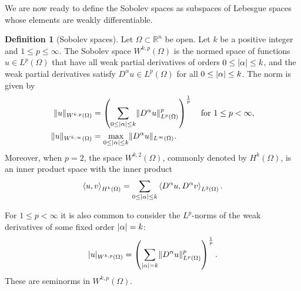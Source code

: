 \documentclass[english, 12pt, a4paper, sci, utf8, a-2b, online]{aaltothesis}
\theoremstyle{definition}
\newtheorem{definition}{Definition}[section]
\theoremstyle{plain}
\DeclarePairedDelimiter\abs{\lvert}{\rvert}
\DeclarePairedDelimiter\norm{\lVert}{\rVert}
\newcommand*{\innerprod}[2]{\left\langle #1, #2 \right\rangle}
\numberwithin{equation}{section}
\begin{document}
We are now ready to define the Sobolev spaces as subspaces of Lebesgue
spaces whose elements are weakly differentiable.
\begin{definition}[Sobolev spaces]
    \label{def:sobolevspaces}
    Let $\Omega \subset \mathbb{R}^n$ be open.
    Let $k$ be a positive integer and $1 \leq p \leq \infty$.
    The Sobolev space $W^{k,p}(\Omega)$ is the normed space of functions
    $u \in L^p(\Omega)$ that have all weak partial derivatives of orders
    $0 \leq \abs{\alpha} \leq k$, and the weak partial derivatives satisfy
    $D^{\alpha} u \in L^p(\Omega)$ for all $0 \leq \abs{\alpha} \leq k$.
    The norm is given by
    \begin{align*}
        \norm{u}_{W^{k,p}(\Omega)}
        &= \left( \sum_{0 \leq \abs{\alpha} \leq k}
                \norm{D^{\alpha} u}_{L^p(\Omega)}^p \right)^{\frac{1}{p}}
                    \quad \text{for } 1 \leq p < \infty, \\
        \norm{u}_{W^{k,\infty}(\Omega)}
        &= \max_{0 \leq \abs{\alpha} \leq k}
                \norm{D^{\alpha} u}_{L^{\infty}(\Omega)}.
    \end{align*}
    Moreover, when $p=2$, the space $W^{k,2}(\Omega)$, commonly denoted
    by $H^k(\Omega)$, is an inner product space with the inner product
    \begin{equation*}
        \innerprod{u}{v}_{H^k(\Omega)}
        = \sum_{0 \leq \abs{\alpha} \leq k}
                \innerprod{D^{\alpha} u}{D^{\alpha} v}_{L^2(\Omega)}.
    \end{equation*}
\end{definition}
For $1 \leq p < \infty$ it is also common to consider the
$L^p$-norms of the weak derivatives of some fixed order $\abs{\alpha} = k$:
\begin{equation*}
    \abs{u}_{W^{k,p}(\Omega)}
    = \left( \sum_{\abs{\alpha} = k}
                \norm{D^{\alpha} u}_{L^p(\Omega)}^p \right)^{\frac{1}{p}}.
\end{equation*}
These are seminorms in $W^{k,p}(\Omega)$.
\end{document}
